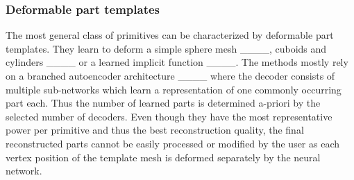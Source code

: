 \subsubsection{Deformable part templates} 
The most general class of primitives can be characterized by deformable part templates.
They learn to deform a simple sphere mesh ____, cuboids and cylinders ____ or a learned implicit function ____.
The methods mostly rely on a branched autoencoder architecture ____ where the decoder consists of multiple sub-networks which learn a representation of one commonly occurring part each.
Thus the number of learned parts is determined a-priori by the selected number of decoders.
Even though they have the most representative power per primitive and thus the best reconstruction quality, the final reconstructed parts cannot be easily processed or modified by the user as each vertex position of the template mesh is deformed separately by the neural network.

